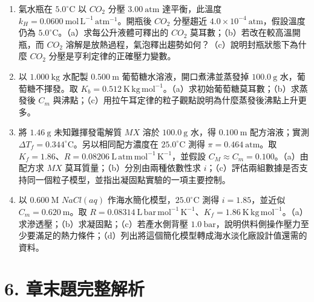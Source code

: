 \documentclass[11pt,a4paper]{article}
\providecommand{\tightlist}{%
  \setlength{\itemsep}{0pt}\setlength{\parskip}{0pt}}
\begin{document}
\begin{enumerate}
\def\labelenumi{\arabic{enumi}.}
\setcounter{enumi}{12}
\tightlist
\item
  氣水瓶在 \(5.0^\circ\mathrm C\) 以 \(CO_2\) 分壓 \(3.00\ \mathrm{atm}\) 達平衡，此溫度 \(k_H=0.0600\ \mathrm{mol\,L^{-1}\,atm^{-1}}\)。開瓶後 \(CO_2\) 分壓趨近 \(4.0\times10^{-4}\ \mathrm{atm}\)，假設溫度仍為 \(5.0^\circ\mathrm C\)。（a）求每公升液體可釋出的 \(CO_2\) 莫耳數；（b）若改在較高溫開瓶，而 \(CO_2\) 溶解是放熱過程，氣泡釋出趨勢如何？（c）說明封瓶狀態下為什麼 \(CO_2\) 分壓是亨利定律的正確壓力變數。
\item
  以 \(1.000\ \mathrm{kg}\) 水配製 \(0.500\ \mathrm m\) 葡萄糖水溶液，開口煮沸並蒸發掉 \(100.0\ \mathrm g\) 水，葡萄糖不揮發。取 \(K_b=0.512\ \mathrm{K\,kg\,mol^{-1}}\)。（a）求初始葡萄糖莫耳數；（b）求蒸發後 \(C_m\) 與沸點；（c）用拉午耳定律的粒子觀點說明為什麼蒸發後沸點上升更多。
\item
  將 \(1.46\ \mathrm g\) 未知難揮發電解質 \(MX\) 溶於 \(100.0\ \mathrm g\) 水，得 \(0.100\ \mathrm m\) 配方溶液；實測 \(\Delta T_f=0.344^\circ\mathrm C\)。另以相同配方濃度在 \(25.0^\circ\mathrm C\) 測得 \(\pi=0.464\ \mathrm{atm}\)。取 \(K_f=1.86\)、\(R=0.08206\ \mathrm{L\,atm\,mol^{-1}\,K^{-1}}\)，並假設 \(C_M\approx C_m=0.100\)。（a）由配方求 \(MX\) 莫耳質量；（b）分別由兩種依數性求 \(i\)；（c）評估兩組數據是否支持同一個粒子模型，並指出凝固點實驗的一項主要控制。
\item
  以 \(0.600\ \mathrm M\) \(NaCl(aq)\) 作海水簡化模型，\(25.0^\circ\mathrm C\) 測得 \(i=1.85\)，並近似 \(C_m=0.620\ \mathrm m\)。取 \(R=0.08314\ \mathrm{L\,bar\,mol^{-1}\,K^{-1}}\)、\(K_f=1.86\ \mathrm{K\,kg\,mol^{-1}}\)。（a）求滲透壓；（b）求凝固點；（c）若產水側背壓 \(1.0\ \mathrm{bar}\)，說明供料側操作壓力至少要滿足的熱力條件；（d）列出將這個簡化模型轉成海水淡化廠設計值還需的資料。
\end{enumerate}

\section{6. 章末題完整解析}\label{ux7ae0ux672bux984cux5b8cux6574ux89e3ux6790}
\end{document}
